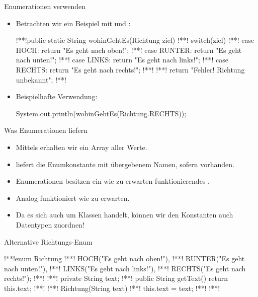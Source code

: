 \begin{frame}[fragile]{Enumerationen verwenden}
    \begin{itemize}[<+(1)->]
        \item Betrachten wir ein Beispiel mit  und :\pause{}
\begin{plainjava}
!**!public static String wohinGehtEs(Richtung ziel){
!**!    switch(ziel) {
!**!        case HOCH:   return "Es geht nach oben!";
!**!        case RUNTER: return "Es geht nach unten!";
!**!        case LINKS:  return "Es geht nach links!";
!**!        case RECHTS: return "Es geht nach rechts!";
!**!    }
!**!    return "Fehler! Richtung unbekannt";
!**!}
\end{plainjava}
    \item<10-> Beispielhafte Verwendung:
\begin{plainjava}
System.out.println(wohinGehtEs(Richtung.RECHTS));
\end{plainjava}
    \end{itemize}
\end{frame}

\begin{frame}[fragile]{Was Enumerationen liefern}
    \begin{itemize}[<+(1)->]
        \widei
        \item Mittels  erhalten wir ein Array aller Werte.
        \item {} liefert die Enumkonstante mit übergebenem Namen,\pause{} sofern vorhanden.
        \item Enumerationen besitzen ein wie zu erwarten funktionierendes .
        \item Analog funktioniert  wie zu erwarten.
        \item Da es sich auch um Klassen handelt, können wir den Konstanten auch Datentypen zuordnen!
    \end{itemize}
\end{frame}

\begin{frame}[fragile,c]{Alternative Richtungs-Enum}
\begin{plainjava}
!**!enum Richtung {
!**!    HOCH("Es geht nach oben!"),
!**!    RUNTER("Es geht nach unten!"),
!**!    LINKS("Es geht nach links!"),
!**!    RECHTS("Es geht nach rechts!");
!**!
!**!    private String text;
!**!    public String getText() { return this.text; }
!**!
!**!    Richtung(String text) {
!**!        this.text = text;
!**!    }
!**!}
\end{plainjava}
\end{frame}

